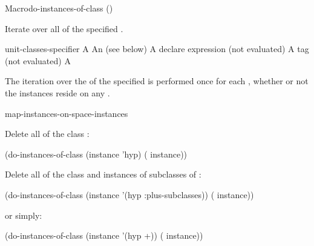 \documentclass[10pt,twoside,english,pdftex]{article}
\begin{document}
\begin{functiondoc}{Macro}{do-instances-of-class}%
{()   
  \superstar{} 
  }
%
%

\fnsyntax

\fnpurpose Iterate over all  of the specified
.

\fnpackage {}

\fnmodule {}

\fnargs
\begin{args}{unit-classes-specifier}
\arg[var] A 
 An 
(see below)
\arg[declaration] A declare expression (not evaluated)
\arg[tag] A  tag (not evaluated)
\arg[form] A 
\end{args}

\fndsyntax
\W\supp\tabletop
\unitclassesspec
\subclassingspec

\fndescription The iteration over the  of the specified
 is performed once for each , whether
or not the instances reside on any .

\begin{alsos}{map-instances-on-space-instances}
\end{alsos}

\fnexamples
Delete all  of the class :
%
\W\supp
\begin{example}
  (do-instances-of-class (instance 'hyp)
    ( instance))
\end{example} 
%
Delete all  of the class  and
instances of subclasses of :
%
\W\supp\notpretop
\begin{example}
  (do-instances-of-class (instance '(hyp :plus-subclasses))
    ( instance))
\end{example} 
%
or simply:
%
\W\supp\notpretop
\begin{example}
  (do-instances-of-class (instance '(hyp +))
    ( instance))
\end{example} 


\end{functiondoc}
\end{document}
